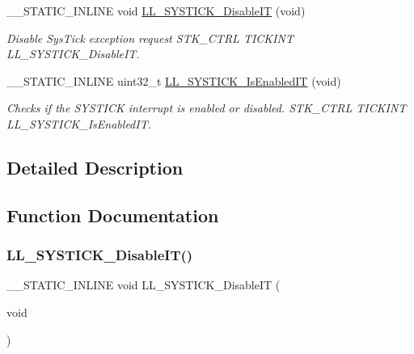 \begin{DoxyCompactItemize}
\+\_\+\+\_\+\+S\+T\+A\+T\+I\+C\+\_\+\+I\+N\+L\+I\+NE void \hyperlink{group___c_o_r_t_e_x___l_l___e_f___s_y_s_t_i_c_k_ga11d0d066050805c9e8d24718d8a15e4d}{L\+L\+\_\+\+S\+Y\+S\+T\+I\+C\+K\+\_\+\+Disable\+IT} (void)
\begin{DoxyCompactList}\small\item\em Disable Sys\+Tick exception request  S\+T\+K\+\_\+\+C\+T\+RL T\+I\+C\+K\+I\+NT L\+L\+\_\+\+S\+Y\+S\+T\+I\+C\+K\+\_\+\+Disable\+IT. \end{DoxyCompactList}\item 
\+\_\+\+\_\+\+S\+T\+A\+T\+I\+C\+\_\+\+I\+N\+L\+I\+NE uint32\+\_\+t \hyperlink{group___c_o_r_t_e_x___l_l___e_f___s_y_s_t_i_c_k_gab34484042fd5a82aa80ba94223b6fbde}{L\+L\+\_\+\+S\+Y\+S\+T\+I\+C\+K\+\_\+\+Is\+Enabled\+IT} (void)
\begin{DoxyCompactList}\small\item\em Checks if the S\+Y\+S\+T\+I\+CK interrupt is enabled or disabled.  S\+T\+K\+\_\+\+C\+T\+RL T\+I\+C\+K\+I\+NT L\+L\+\_\+\+S\+Y\+S\+T\+I\+C\+K\+\_\+\+Is\+Enabled\+IT. \end{DoxyCompactList}\end{DoxyCompactItemize}


\subsection{Detailed Description}


\subsection{Function Documentation}
\mbox{\label{group___c_o_r_t_e_x___l_l___e_f___s_y_s_t_i_c_k_ga11d0d066050805c9e8d24718d8a15e4d}} 
\subsubsection{\texorpdfstring{L\+L\+\_\+\+S\+Y\+S\+T\+I\+C\+K\+\_\+\+Disable\+I\+T()}{LL\_SYSTICK\_DisableIT()}}
{\footnotesize\ttfamily \+\_\+\+\_\+\+S\+T\+A\+T\+I\+C\+\_\+\+I\+N\+L\+I\+NE void L\+L\+\_\+\+S\+Y\+S\+T\+I\+C\+K\+\_\+\+Disable\+IT (\begin{DoxyParamCaption}\item[{void}]{ }\end{DoxyParamCaption})}



